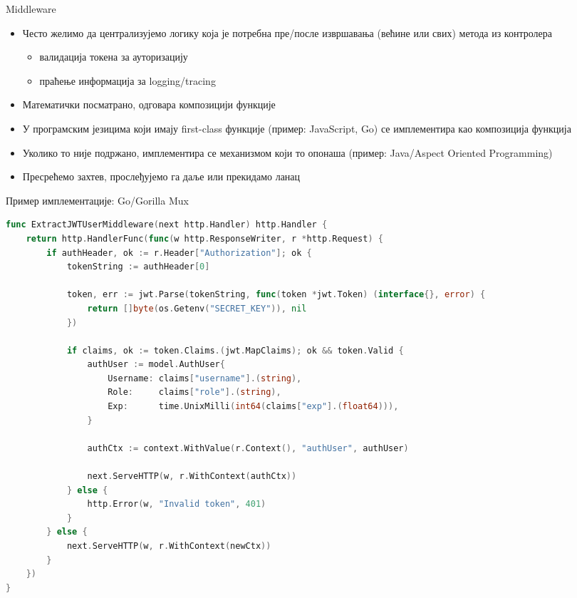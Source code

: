 \documentclass[aspectratio=169]{beamer}
\begin{document}
    \begin{frame}{Middleware}
        \begin{itemize}
            \item Често желимо да централизујемо логику која је потребна пре/после извршавања (већине или свих) метода из контролера
            \begin{itemize}
                \item валидација токена за ауторизацију
                \item праћење информација за logging/tracing
            \end{itemize}
            \item Математички посматрано, одговара композицији функције
            \item У програмским језицима који имају first-class функције (пример: JavaScript, Go) се имплементира као композиција функција
            \item Уколико то није подржано, имплементира се механизмом који то опонаша (пример: Java/Aspect Oriented Programming)
            \item Пресрећемо захтев, прослеђујемо га даље или прекидамо ланац
        \end{itemize}
    \end{frame}
    
    \begin{frame}[fragile]{Пример имплементације: Go/Gorilla Mux}
        \begin{adjustbox}{width=\textwidth,height=0.45\textheight,keepaspectratio}
            \begin{lstlisting}[language=go]
func ExtractJWTUserMiddleware(next http.Handler) http.Handler {
    return http.HandlerFunc(func(w http.ResponseWriter, r *http.Request) {
        if authHeader, ok := r.Header["Authorization"]; ok {
            tokenString := authHeader[0]

            token, err := jwt.Parse(tokenString, func(token *jwt.Token) (interface{}, error) {
                return []byte(os.Getenv("SECRET_KEY")), nil
            })

            if claims, ok := token.Claims.(jwt.MapClaims); ok && token.Valid {
                authUser := model.AuthUser{
                    Username: claims["username"].(string),
                    Role:     claims["role"].(string),
                    Exp:      time.UnixMilli(int64(claims["exp"].(float64))),
                }

                authCtx := context.WithValue(r.Context(), "authUser", authUser)

                next.ServeHTTP(w, r.WithContext(authCtx))
            } else {
                http.Error(w, "Invalid token", 401)
            }
        } else {
            next.ServeHTTP(w, r.WithContext(newCtx))
        }
    })
}
            \end{lstlisting}
        \end{adjustbox}
    \end{frame}
    
\end{document}
